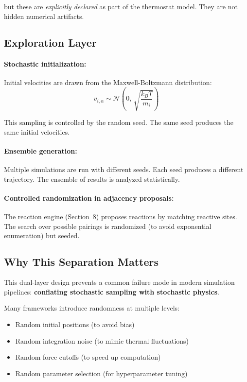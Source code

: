\documentclass[11pt]{article}
\begin{document}
but these are \textit{explicitly declared} as part of the thermostat model. They are not hidden numerical artifacts.

\subsection{Exploration Layer}

\paragraph{Stochastic initialization:}

Initial velocities are drawn from the Maxwell-Boltzmann distribution:
\[
v_{i,\alpha} \sim \mathcal{N}\left(0,\,\sqrt{\frac{k_B T}{m_i}}\right)
\]

This sampling is controlled by the random seed. The same seed produces the same initial velocities.

\paragraph{Ensemble generation:}

Multiple simulations are run with different seeds. Each seed produces a different trajectory. The ensemble of results is analyzed statistically.

\paragraph{Controlled randomization in adjacency proposals:}

The reaction engine (Section~8) proposes reactions by matching reactive sites. The search over possible pairings is randomized (to avoid exponential enumeration) but seeded.

\subsection{Why This Separation Matters}

This dual-layer design prevents a common failure mode in modern simulation pipelines: \textbf{conflating stochastic sampling with stochastic physics}.

Many frameworks introduce randomness at multiple levels:
\begin{itemize}
\item Random initial positions (to avoid bias)
\item Random integration noise (to mimic thermal fluctuations)
\item Random force cutoffs (to speed up computation)
\item Random parameter selection (for hyperparameter tuning)
\end{itemize}
\end{document}

